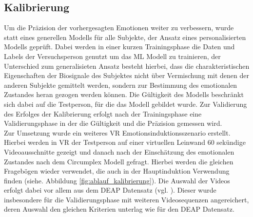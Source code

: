 \subsection{Kalibrierung} \label{kalibrierung-4}

Um die Präzision der vorhergesagten Emotionen weiter zu verbessern, wurde statt eines generellen Modells für alle Subjekte, der Ansatz eines personalisierten Modells geprüft. Dabei werden in einer kurzen Trainingsphase die Daten und Labels der Versuchsperson genutzt um das ML Modell zu trainieren, der Unterschied zum generalisieten Ansatz besteht hierbei, dass die charakteristischen Eigenschaften der Biosignale des Subjektes nicht über Vermischung mit denen der anderen Subjekte gemittelt werden, sondern zur Bestimmung des emotionalen Zustandes heran gezogen werden können. Die Gültigkeit des Modells beschränkt sich dabei auf die Testperson, für die das Modell gebildet wurde. Zur Validierung des Erfolges der Kalibrierung erfolgt nach der Trainingsphase eine Validierungsphase in der die Gültigkeit und die Präzision gemessen wird. \\

Zur Umsetzung wurde ein weiteres VR Emotionsinduktionsszenario erstellt. Hierbei werden in VR der Testperson auf einer virtuellen Leinwand 60 sekündige Videoausschnitte gezeigt und danach nach der Einschätzung des emotionalen Zustandes nach dem Circumplex Modell gefragt. Hierbei werden die gleichen Fragebögen wieder verwendet, die auch in der Hauptinduktion Verwendung finden (siehe. Abbildung \ref{fig:ablauf_kalibrierung}). Die Auswahl der Videos erfolgt dabei vor allem aus dem DEAP Datensatz (vgl. \cite{}). Dieser wurde insbesondere für die Validierungsphase mit weiteren Videosequenzen angereichert, deren Auswahl den gleichen Kriterien unterlag wie für den DEAP Datensatz. \\

